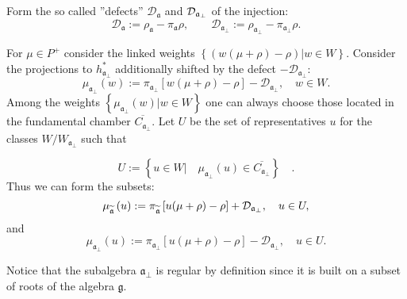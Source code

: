 \documentclass[preprint,12pt]{elsarticle}
\newcommand{\af}{\mathfrak{a}}
\newcommand{\afb}{\mathfrak{a}_{\bot}}
\begin{document}
 Form the so called ''defects'' $\mathcal{D}_{\af}$ and $\mathcal{%
D}_{\afb}$ of the injection:
\begin{equation}
\mathcal{D}_{\af}:=\rho _{\af}-\pi _{\af}\rho , \qquad
\mathcal{D}_{\afb}:=\rho _{\afb}-\pi _{\af%
_{\perp }}\rho .  \label{defect-ort}
\end{equation}

For $\mu \in P^{+}$ consider the linked weights $\left\{
\left( w(\mu +\rho )-\rho \right) |w\in W\right\} $. Consider the projections to
$h_{\afb}^{\ast }$ additionally shifted by the defect $-%
\mathcal{D}_{\afb}$:
\begin{equation*}
\mu _{\afb}\left( w\right) :=\pi _{\afb}\left[
w(\mu +\rho )-\rho \right] -\mathcal{D}_{\afb},\quad w\in W.
\end{equation*}
Among the weights $\left\{ \mu _{\af_{\perp
}}\left( w\right) |w\in W\right\} $ one can always choose those located in
the fundamental chamber $\overline{C_{\afb}}$. Let $U$ be the
set of representatives $u$ for the classes $W/W_{\afb}$ such
that

\begin{equation}
U:=\left\{ u\in W|\quad \mu _{\afb}\left( u\right) \in
\overline{C_{\afb}}\right\} \quad .  \label{U-def}
\end{equation}
Thus we can form the subsets:
\begin{equation}
\mu _{\widetilde{\mathfrak{a}}}\left( u\right) :=\pi _{\widetilde{%
\mathfrak{a}}}\left[ u(\mu +\rho )-\rho \right] +\mathcal{D}_{\af%
_{\perp }},\quad u\in U,  \label{mu-a}
\end{equation}
and
\begin{equation}
\mu _{\afb}\left( u\right) :=\pi _{\afb}\left[
u(\mu +\rho )-\rho \right] -\mathcal{D}_{\afb},\quad u\in U.
\label{mu-a-tilda}
\end{equation}

Notice that the subalgebra $\mathfrak{a}_{\bot}$ is regular by definition
since it is built on a subset of roots of the algebra $\mathfrak{g}$.
\end{document}
